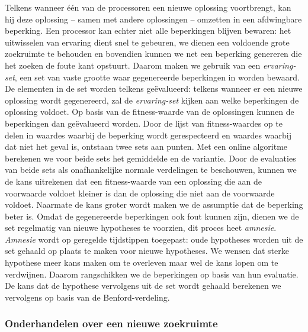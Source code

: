 Telkens wanneer \'e\'en van de processoren een nieuwe oplossing voortbrengt, kan hij deze oplossing -- samen met andere oplossingen -- omzetten in een afdwingbare beperking. Een processor kan echter niet alle beperkingen blijven bewaren: het uitwisselen van ervaring dient snel te gebeuren, we dienen een voldoende grote zoekruimte te behouden en bovendien kunnen we net een beperking genereren die het zoeken de foute kant opstuurt. Daarom maken we gebruik van een \emph{ervaring-set}, een set van vaste grootte waar gegenereerde beperkingen in worden bewaard. De elementen in de set worden telkens ge\"evalueerd: telkens wanneer er een nieuwe oplossing wordt gegenereerd, zal de \emph{ervaring-set} kijken aan welke beperkingen de oplossing voldoet. Op basis van de fitness-waarde van de oplossingen kunnen de beperkingen dan ge\"evalueerd worden. Door de lijst van fitness-waardes op te delen in waardes waarbij de beperking wordt gerespecteerd en waardes waarbij dat niet het geval is, ontstaan twee sets aan punten. Met een online algoritme\cite[p. 232]{citeulike:175026} berekenen we voor beide sets het gemiddelde en de variantie. Door de evaluaties van beide sets als onafhankelijke normale verdelingen te beschouwen, kunnen we de kans uitrekenen dat een fitness-waarde van een oplossing die aan de voorwaarde voldoet kleiner is dan de oplossing die niet aan de voorwaarde voldoet. Naarmate de kans groter wordt maken we de assumptie dat de beperking beter is. Omdat de gegenereerde beperkingen ook fout kunnen zijn, dienen we de set regelmatig van nieuwe hypotheses te voorzien, dit proces heet \emph{amnesie}. \emph{Amnesie} wordt op geregelde tijdstippen toegepast: oude hypotheses worden uit de set gehaald op plaats te maken voor nieuwe hypotheses. We wensen dat sterke hypothese meer kans maken om te overleven maar wel de kans lopen om te verdwijnen. Daarom rangschikken we de beperkingen op basis van hun evaluatie. De kans dat de hypothese vervolgens uit de set wordt gehaald berekenen we vervolgens op basis van de Benford-verdeling\cite{citeulike:748130}.

\subsubsection{Onderhandelen over een nieuwe zoekruimte}

